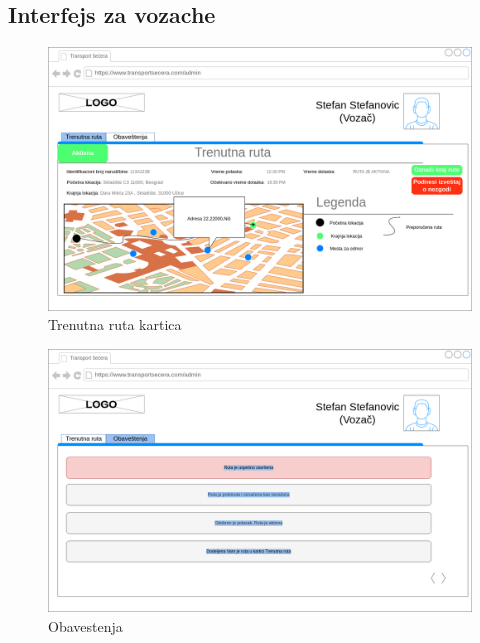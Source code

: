 \subsection{Interfejs za vozache}
\begin{figure}[H]
	\centering
	\includegraphics[scale=0.25]{Slike/KorisnickiInterfejs/Vozac/VozacTrenutnaRuta.png}
	\caption{Trenutna ruta kartica}
	\label{fig:trenutnaruta}
\end{figure}
\begin{figure}[H]
	\centering
	\includegraphics[scale=0.25]{Slike/KorisnickiInterfejs/Vozac/VozacObavestenja.drawio.png}
	\caption{Obavestenja}
	\label{fig:obavestenja}
\end{figure}
